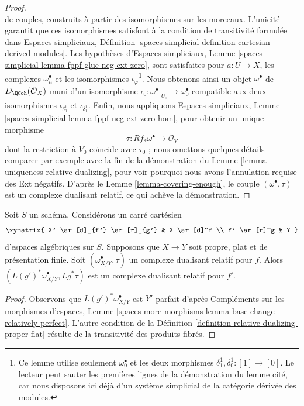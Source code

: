 \begin{proof}
$$$$
de couples, construits à partir des isomorphismes sur les morceaux.
L'unicité garantit que ces isomorphismes satisfont
à la condition de transitivité formulée dans
Espaces simpliciaux, Définition
\ref{spaces-simplicial-definition-cartesian-derived-modules}.
Les hypothèses d'Espaces simpliciaux, Lemme
\ref{spaces-simplicial-lemma-fppf-glue-neg-ext-zero},
sont satisfaites pour $a : U \to X$, les complexes $\omega_n^\bullet$
et les isomorphismes $\iota_\varphi$\footnote{Ce lemme utilise seulement
$\omega_0^\bullet$ et les deux morphismes $\delta_1^1, \delta_0^1 : [1] \to [0]$.
Le lecteur peut sauter les premières lignes de la démonstration du
lemme cité,
car nous disposons ici déjà d'un système simplicial de la
catégorie dérivée des modules.}.
Nous obtenons ainsi un objet $\omega^\bullet$ de $D_\QCoh(\mathcal{O}_X)$
muni d'un isomorphisme
$\iota_0 : \omega^\bullet|_{U_0} \to \omega_0^\bullet$
compatible aux deux isomorphismes
$\iota_{\delta^1_0}$ et $\iota_{\delta^1_1}$.
Enfin, nous appliquons
Espaces simpliciaux, Lemme
\ref{spaces-simplicial-lemma-fppf-neg-ext-zero-hom},
pour obtenir un unique morphisme
$$
\tau : Rf_*\omega^\bullet \longrightarrow \mathcal{O}_Y
$$
dont la restriction à $V_0$ coïncide avec $\tau_0$ ; nous omettons quelques détails --
comparer par exemple avec la fin de la démonstration du
Lemme \ref{lemma-uniqueness-relative-dualizing},
pour voir pourquoi nous avons
l'annulation requise des Ext négatifs.
D'après le Lemme \ref{lemma-covering-enough},
le couple $(\omega^\bullet, \tau)$ est un complexe dualisant relatif,
ce qui achève la démonstration.
\end{proof}

\begin{lemma}
\label{lemma-base-change-relative-dualizing}
Soit $S$ un schéma. Considérons un carré cartésien
$$
\xymatrix{
X' \ar[d]_{f'} \ar[r]_{g'} & X \ar[d]^f \\
Y' \ar[r]^g & Y
}
$$
d'espaces algébriques sur $S$. Supposons que $X \to Y$ soit propre, plat et
de présentation finie. Soit $(\omega_{X/Y}^\bullet, \tau)$ un
complexe dualisant relatif pour $f$. Alors
$(L(g')^*\omega_{X/Y}^\bullet, Lg^*\tau)$ est un complexe dualisant
relatif pour $f'$.
\end{lemma}

\begin{proof}
Observons que $L(g')^*\omega_{X/Y}^\bullet$ est $Y'$-parfait d'après
Compléments sur les morphismes d'espaces, Lemme
\ref{spaces-more-morphisms-lemma-base-change-relatively-perfect}.
L'autre condition de la
Définition \ref{definition-relative-dualizing-proper-flat}
résulte de la transitivité des produits fibrés.
\end{proof}






